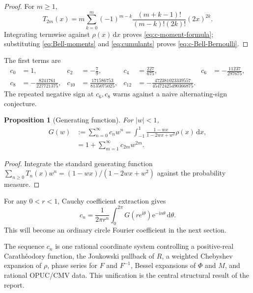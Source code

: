 \documentclass[11pt,oneside]{article}
\newtheorem{proposition}[theorem]{Proposition}
\theoremstyle{definition}
\newcommand{\dd}{\,\mathrm d}
\newcommand{\ee}{\mathrm e}
\newcommand{\ii}{\mathrm i}
\begin{document}
\begin{proof}
For \(m\ge1\),
\[
 T_{2m}(x)=m\sum_{k=0}^{m}(-1)^{m-k}
 \frac{(m+k-1)!}{(m-k)!(2k)!}(2x)^{2k}.
\]
Integrating termwise against \(\rho(x)\dd x\) proves \eqref{eq:c-moment-formula}; substituting
\eqref{eq:Bell-moments} and \eqref{eq:cumulants} proves \eqref{eq:c-Bell-Bernoulli}.
\end{proof}

The first terms are
\begin{align*}
 c_0&=1,&c_2&=-\frac79,&c_4&=\frac{227}{675},&c_6&=-\frac{11237}{297675},\\
 c_8&=-\frac{8241761}{227721375},&
 c_{10}&=\frac{171586753}{8135075025},&
 c_{12}&=-\frac{472381023339557}{45472425490366875}.
\end{align*}
The repeated negative sign at \(c_6,c_8\) warns against a naive alternating-sign conjecture.

\begin{proposition}[Generating function]
\label{prop:G-cheb}
For \(|w|<1\),
\begin{align}
 G(w)&:=\sum_{n=0}^{\infty}c_nw^n
 =\int_{-1}^{1}\frac{1-wx}{1-2wx+w^2}\rho(x)\dd x,
 \label{eq:G-cheb}\\
 &=1+\sum_{m=1}^{\infty}c_{2m}w^{2m}.
 \label{eq:G-even}
\end{align}
\end{proposition}

\begin{proof}
Integrate the standard generating function
\(\sum_{n\ge0}T_n(x)w^n=(1-wx)/(1-2wx+w^2)\) against the probability measure.
\end{proof}

For any \(0<r<1\), Cauchy coefficient extraction gives
\begin{equation}
 c_n=\frac{1}{2\pi r^n}\int_0^{2\pi}G(re^{\ii\theta})
 \ee^{-\ii n\theta}\dd\theta.
 \label{eq:c-Cauchy-coefficient}
\end{equation}
This will become an ordinary circle Fourier coefficient in the next section.

\begin{novelbox}
The sequence \(c_n\) is one rational coordinate system controlling a positive-real
Carath\'eodory function, the Joukowski pullback of \(R\), a weighted Chebyshev expansion of
\(\rho\), phase series for \(F\) and \(F^{-1}\), Bessel expansions of \(\Phi\) and \(M\),
and rational OPUC/CMV data. This unification is the central structural result of the report.
\end{novelbox}
\end{document}
